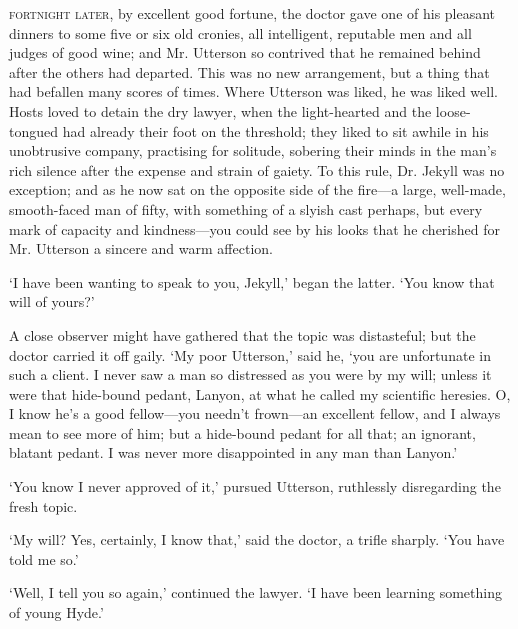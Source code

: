 \documentclass[]{novel}
\begin{document}
\clearpage
\label{ch:03}
\begin{ChapterStart}
\vspace*{4\nbs}
\null\vspace{0.75\nbs}
\vspace{0.375\nbs}
\end{ChapterStart}

\textsc{fortnight later,} by excellent good fortune, the doctor gave one of his pleasant dinners to some five or six old cronies, all intelligent, reputable men and all judges of good wine; and Mr. Utterson so contrived that he remained behind after the others had departed. This was no new arrangement, but a thing that had befallen many scores of times. Where Utterson was liked, he was liked well. Hosts loved to detain the dry lawyer, when the light-hearted and the loose-tongued had already their foot on the threshold; they liked to sit awhile in his unobtrusive company, practising for solitude, sobering their minds in the man's rich silence after the expense and strain of gaiety. To this rule, Dr. Jekyll was no exception; and as he now sat on the opposite side of the fire—a large, well-made, smooth-faced man of fifty, with something of a slyish cast perhaps, but every mark of capacity and kindness—you could see by his looks that he cherished for Mr. Utterson a sincere and warm affection.

‘I have been wanting to speak to you, Jekyll,’ began the latter. ‘You know that will of yours?’

A close observer might have gathered that the topic was distasteful; but the doctor carried it off gaily. ‘My poor Utterson,’ said he, ‘you are unfortunate in such a client. I never saw a man so distressed as you were by my will; unless it were that hide-bound pedant, Lanyon, at what he called my scientific heresies. O, I know he’s a good fellow—you needn’t frown—an excellent fellow, and I always mean to see more of him; but a hide-bound pedant for all that; an ignorant, blatant pedant. I was never more disappointed in any man than Lanyon.’

‘You know I never approved of it,’ pursued Utterson, ruthlessly disregarding the fresh topic.

‘My will? Yes, certainly, I know that,’ said the doctor, a trifle sharply. ‘You have told me so.’

‘Well, I tell you so again,’ continued the lawyer. ‘I have been learning something of young Hyde.’
\end{document}
